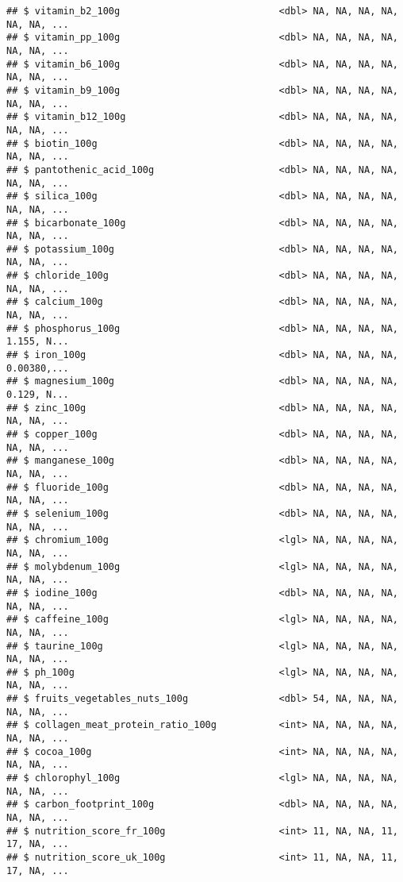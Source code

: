 \documentclass[]{article}
\begin{document}
\begin{verbatim}
## $ vitamin_b2_100g                            <dbl> NA, NA, NA, NA, NA, NA, ...
## $ vitamin_pp_100g                            <dbl> NA, NA, NA, NA, NA, NA, ...
## $ vitamin_b6_100g                            <dbl> NA, NA, NA, NA, NA, NA, ...
## $ vitamin_b9_100g                            <dbl> NA, NA, NA, NA, NA, NA, ...
## $ vitamin_b12_100g                           <dbl> NA, NA, NA, NA, NA, NA, ...
## $ biotin_100g                                <dbl> NA, NA, NA, NA, NA, NA, ...
## $ pantothenic_acid_100g                      <dbl> NA, NA, NA, NA, NA, NA, ...
## $ silica_100g                                <dbl> NA, NA, NA, NA, NA, NA, ...
## $ bicarbonate_100g                           <dbl> NA, NA, NA, NA, NA, NA, ...
## $ potassium_100g                             <dbl> NA, NA, NA, NA, NA, NA, ...
## $ chloride_100g                              <dbl> NA, NA, NA, NA, NA, NA, ...
## $ calcium_100g                               <dbl> NA, NA, NA, NA, NA, NA, ...
## $ phosphorus_100g                            <dbl> NA, NA, NA, NA, 1.155, N...
## $ iron_100g                                  <dbl> NA, NA, NA, NA, 0.00380,...
## $ magnesium_100g                             <dbl> NA, NA, NA, NA, 0.129, N...
## $ zinc_100g                                  <dbl> NA, NA, NA, NA, NA, NA, ...
## $ copper_100g                                <dbl> NA, NA, NA, NA, NA, NA, ...
## $ manganese_100g                             <dbl> NA, NA, NA, NA, NA, NA, ...
## $ fluoride_100g                              <dbl> NA, NA, NA, NA, NA, NA, ...
## $ selenium_100g                              <dbl> NA, NA, NA, NA, NA, NA, ...
## $ chromium_100g                              <lgl> NA, NA, NA, NA, NA, NA, ...
## $ molybdenum_100g                            <lgl> NA, NA, NA, NA, NA, NA, ...
## $ iodine_100g                                <dbl> NA, NA, NA, NA, NA, NA, ...
## $ caffeine_100g                              <lgl> NA, NA, NA, NA, NA, NA, ...
## $ taurine_100g                               <lgl> NA, NA, NA, NA, NA, NA, ...
## $ ph_100g                                    <lgl> NA, NA, NA, NA, NA, NA, ...
## $ fruits_vegetables_nuts_100g                <dbl> 54, NA, NA, NA, NA, NA, ...
## $ collagen_meat_protein_ratio_100g           <int> NA, NA, NA, NA, NA, NA, ...
## $ cocoa_100g                                 <int> NA, NA, NA, NA, NA, NA, ...
## $ chlorophyl_100g                            <lgl> NA, NA, NA, NA, NA, NA, ...
## $ carbon_footprint_100g                      <dbl> NA, NA, NA, NA, NA, NA, ...
## $ nutrition_score_fr_100g                    <int> 11, NA, NA, 11, 17, NA, ...
## $ nutrition_score_uk_100g                    <int> 11, NA, NA, 11, 17, NA, ...
\end{verbatim}
\end{document}
